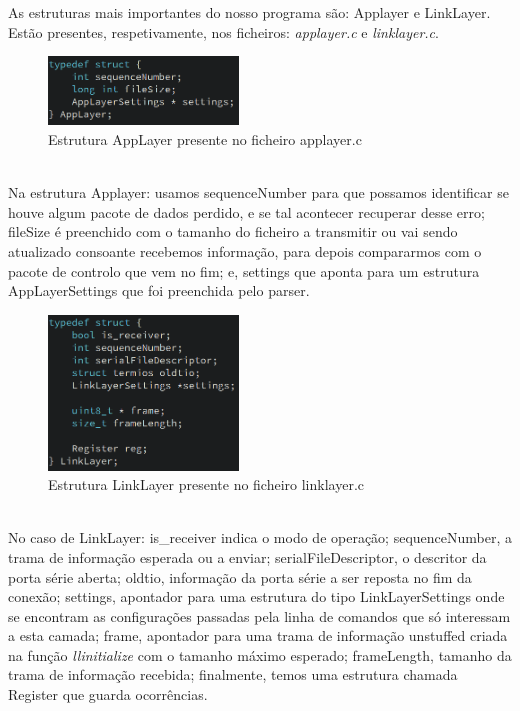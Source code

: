 \documentclass[a4paper]{article}
\begin{document}
As estruturas mais importantes do nosso programa são: Applayer e LinkLayer.
Estão presentes, respetivamente, nos ficheiros: \textit{applayer.c} e
\textit{linklayer.c}.\\
\begin{figure}[h]
\centering
    \includegraphics[width=0.45\textwidth]{applayerStruct.png}
    \caption{Estrutura AppLayer presente no ficheiro applayer.c}
\end{figure} \\
Na estrutura Applayer: usamos sequenceNumber para que possamos identificar se
houve algum pacote de dados perdido, e se tal acontecer recuperar desse erro;
fileSize é preenchido com o tamanho do ficheiro a transmitir ou vai sendo
atualizado consoante recebemos informação, para depois compararmos com o pacote
de controlo que vem no fim; e, settings que aponta para um estrutura
AppLayerSettings que foi preenchida pelo parser.\\
\begin{figure}[h]
\centering
    \includegraphics[width=0.45\textwidth]{linklayerStruct.png}
    \caption{Estrutura LinkLayer presente no ficheiro linklayer.c}
\end{figure}
\\ No
caso de LinkLayer: is\_receiver indica o modo de operação; sequenceNumber, a
trama de informação esperada ou a enviar; serialFileDescriptor, o descritor da
porta série aberta; oldtio, informação da porta série a ser reposta no fim da
conexão; settings, apontador para uma estrutura do tipo LinkLayerSettings onde
se encontram as configurações passadas pela linha de comandos que só interessam
a esta camada; frame, apontador para uma trama de informação unstuffed criada
na função \textit{llinitialize} com o tamanho máximo esperado; frameLength,
tamanho da trama de informação recebida; finalmente, temos uma estrutura
chamada Register que guarda ocorrências.
\end{document}
